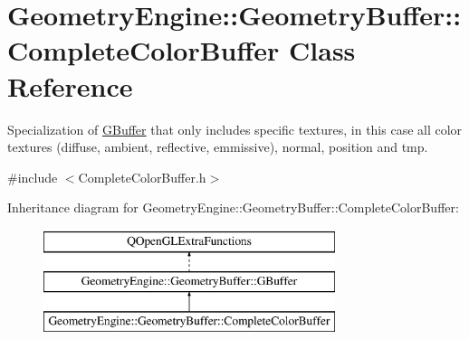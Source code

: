 \hypertarget{class_geometry_engine_1_1_geometry_buffer_1_1_complete_color_buffer}{}\section{Geometry\+Engine\+::Geometry\+Buffer\+::Complete\+Color\+Buffer Class Reference}
\label{class_geometry_engine_1_1_geometry_buffer_1_1_complete_color_buffer}


Specialization of \mbox{\hyperlink{class_geometry_engine_1_1_geometry_buffer_1_1_g_buffer}{G\+Buffer}} that only includes specific textures, in this case all color textures (diffuse, ambient, reflective, emmissive), normal, position and tmp.  




{\ttfamily \#include $<$Complete\+Color\+Buffer.\+h$>$}

Inheritance diagram for Geometry\+Engine\+::Geometry\+Buffer\+::Complete\+Color\+Buffer\+:\begin{figure}[H]
\begin{center}
\leavevmode
\includegraphics[height=3.000000cm]{class_geometry_engine_1_1_geometry_buffer_1_1_complete_color_buffer}
\end{center}
\end{figure}
